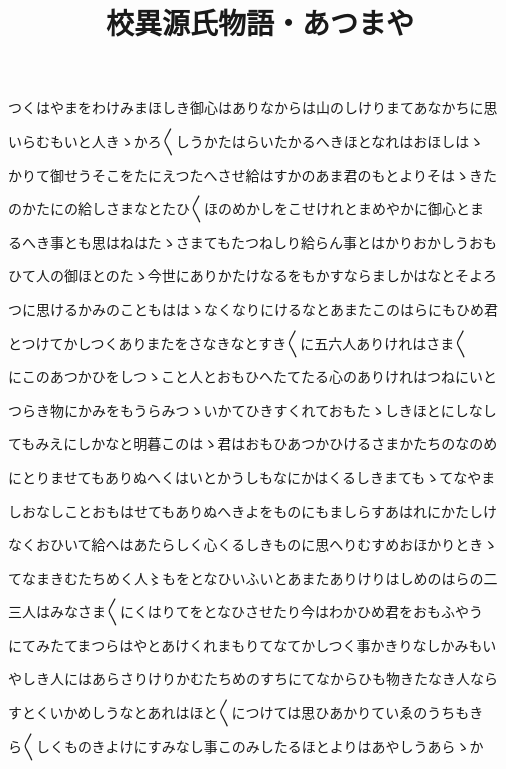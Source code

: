 \documentclass[a4paper,11pt,landscape]{ltjtarticle}
\title{校異源氏物語・あつまや}
\date{}
\begin{document}
\maketitle

つくはやまをわけみまほしき御心はありなからは山のしけりまてあなかちに思
\par\medskip
いらむもいと人きゝかろ〱しうかたはらいたかるへきほとなれはおほしはゝ
\par\medskip
かりて御せうそこをたにえつたへさせ給はすかのあま君のもとよりそはゝきた
\par\medskip
のかたにの給しさまなとたひ〱ほのめかしをこせけれとまめやかに御心とま
\par\medskip
るへき事とも思はねはたゝさまてもたつねしり給らん事とはかりおかしうおも
\par\medskip
ひて人の御ほとのたゝ今世にありかたけなるをもかすならましかはなとそよろ
\par\medskip
つに思けるかみのこともははゝなくなりにけるなとあまたこのはらにもひめ君
\par\medskip
とつけてかしつくありまたをさなきなとすき〱に五六人ありけれはさま〱
\par\medskip
にこのあつかひをしつゝこと人とおもひへたてたる心のありけれはつねにいと
\par\medskip
つらき物にかみをもうらみつゝいかてひきすくれておもたゝしきほとにしなし
\par\medskip
てもみえにしかなと明暮このはゝ君はおもひあつかひけるさまかたちのなのめ
\par\medskip
にとりませてもありぬへくはいとかうしもなにかはくるしきまてもゝてなやま
\par\medskip
しおなしことおもはせてもありぬへきよをものにもましらすあはれにかたしけ
\par\medskip
なくおひいて給へはあたらしく心くるしきものに思へりむすめおほかりときゝ
\par\medskip
てなまきむたちめく人〻もをとなひいふいとあまたありけりはしめのはらの二
\par\medskip
三人はみなさま〱にくはりてをとなひさせたり今はわかひめ君をおもふやう
\par\medskip
にてみたてまつらはやとあけくれまもりてなてかしつく事かきりなしかみもい
\par\medskip
やしき人にはあらさりけりかむたちめのすちにてなからひも物きたなき人なら
\par\medskip
すとくいかめしうなとあれはほと〱につけては思ひあかりていゑのうちもき
\par\medskip
ら〱しくものきよけにすみなし事このみしたるほとよりはあやしうあらゝか
\end{document}
